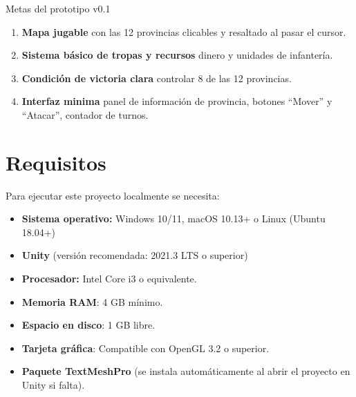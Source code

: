 \documentclass[a4paper,12pt]{article}
\begin{document}
\begin{description}
    \item[Metas del prototipo v0.1] 
\end{description}
\begin{enumerate}
    \item \textbf{Mapa jugable} con las 12 provincias clicables y resaltado al pasar el cursor.
    \item \textbf{Sistema básico de tropas y recursos} dinero y unidades de infantería.
    \item \textbf{Condición de victoria clara} controlar  8 de las 12 provincias.
    \item \textbf{Interfaz minima} panel de información de provincia, botones “Mover” y “Atacar”, contador de turnos.
\end{enumerate}
\section{Requisitos}
\begin{justify}
    Para ejecutar este proyecto localmente se necesita: 
\end{justify}
\begin{itemize}
    \item \textbf {Sistema operativo:} Windows 10/11, macOS 10.13+ o Linux (Ubuntu 18.04+)
    \item \textbf{Unity} (versión recomendada: 2021.3 LTS o superior)
    \item \textbf{Procesador:} Intel Core i3 o equivalente. 
    \item \textbf{Memoria RAM}: 4 GB mínimo. 
    \item \textbf{Espacio en disco}: 1 GB libre. 
    \item \textbf{Tarjeta gráfica}: Compatible con OpenGL 3.2 o superior. 
    \item \textbf{Paquete TextMeshPro} (se instala automáticamente al abrir el proyecto en Unity si falta). 
\end{itemize}
\end{document}
